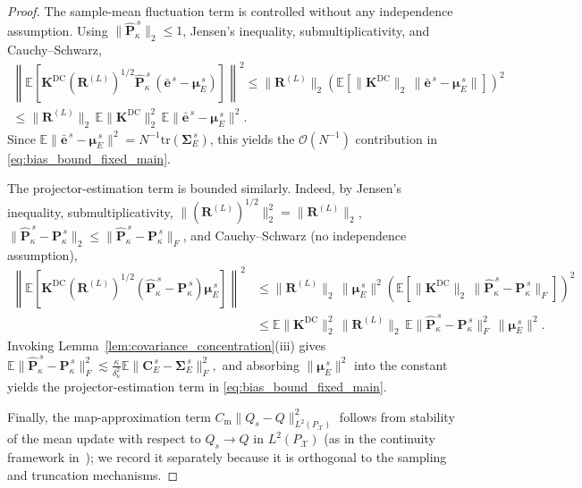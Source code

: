 \documentclass[11pt,a4paper]{article}
\begin{document}
\begin{proof}
The sample-mean fluctuation term is controlled without any independence assumption. Using $\|\hat{\mathbf{P}}_\kappa^{\,s}\|_2\le 1$, Jensen's inequality, submultiplicativity, and Cauchy--Schwarz,
\begin{multline*}
\left\|\mathbb{E}\!\left[\mathbf{K}^{\mathrm{DC}}(\mathbf{R}^{(L)})^{1/2}\hat{\mathbf{P}}_\kappa^{\,s}\,(\bar{\mathbf{e}}^{\,s}-\boldsymbol{\mu}_E^{\,s})\right]\right\|^2
\le
\|\mathbf{R}^{(L)}\|_2
\left(\mathbb{E}\!\left[\|\mathbf{K}^{\mathrm{DC}}\|_2\,\|\bar{\mathbf{e}}^{\,s}-\boldsymbol{\mu}_E^{\,s}\|\right]\right)^2\\
\le
\|\mathbf{R}^{(L)}\|_2\,\mathbb{E}\|\mathbf{K}^{\mathrm{DC}}\|_2^2\,
\mathbb{E}\|\bar{\mathbf{e}}^{\,s}-\boldsymbol{\mu}_E^{\,s}\|^2.
\end{multline*}
Since $\mathbb{E}\|\bar{\mathbf{e}}^{\,s}-\boldsymbol{\mu}_E^{\,s}\|^2=N^{-1}\mathrm{tr}(\boldsymbol{\Sigma}_E^{\,s})$, this yields the $\mathcal{O}(N^{-1})$ contribution in \eqref{eq:bias_bound_fixed_main}.

	The projector-estimation term is bounded similarly. Indeed, by Jensen's inequality, submultiplicativity, $\|(\mathbf{R}^{(L)})^{1/2}\|_2^2=\|\mathbf{R}^{(L)}\|_2$, $\|\hat{\mathbf{P}}_\kappa^{\,s}-\mathbf{P}_\kappa^{\,s}\|_2\le \|\hat{\mathbf{P}}_\kappa^{\,s}-\mathbf{P}_\kappa^{\,s}\|_F$, and Cauchy--Schwarz (no independence assumption),
	\begin{align*}
	\left\|\mathbb{E}\!\left[\mathbf{K}^{\mathrm{DC}}(\mathbf{R}^{(L)})^{1/2}(\hat{\mathbf{P}}_\kappa^{\,s}-\mathbf{P}_\kappa^{\,s})\boldsymbol{\mu}_E^{\,s}\right]\right\|^2
	&\le
	\|\mathbf{R}^{(L)}\|_2\,\|\boldsymbol{\mu}_E^{\,s}\|^2
	\left(\mathbb{E}\!\left[\|\mathbf{K}^{\mathrm{DC}}\|_2\,\|\hat{\mathbf{P}}_\kappa^{\,s}-\mathbf{P}_\kappa^{\,s}\|_F\right]\right)^2\\
	&\le
	\mathbb{E}\|\mathbf{K}^{\mathrm{DC}}\|_2^2\,\|\mathbf{R}^{(L)}\|_2\,
	\mathbb{E}\|\hat{\mathbf{P}}_\kappa^{\,s}-\mathbf{P}_\kappa^{\,s}\|_F^2\,\|\boldsymbol{\mu}_E^{\,s}\|^2.
	\end{align*}
	Invoking Lemma~\ref{lem:covariance_concentration}(iii) gives
	\(
	\mathbb{E}\|\hat{\mathbf{P}}_\kappa^{\,s}-\mathbf{P}_\kappa^{\,s}\|_F^2
\lesssim
\frac{\kappa}{\delta_\kappa^2}\mathbb{E}\|\mathbf{C}_E^{\,s}-\boldsymbol{\Sigma}_E^{\,s}\|_F^2,
\)
and absorbing $\|\boldsymbol{\mu}_E^{\,s}\|^2$ into the constant yields the projector-estimation term in \eqref{eq:bias_bound_fixed_main}.

Finally, the map-approximation term $C_{\mathrm{m}}\|Q_s-Q\|_{L^2(P_{\mathcal{X}})}^2$ follows from stability of the mean update with respect to $Q_s\to Q$ in $L^2(P_{\mathcal{X}})$ (as in the continuity framework in~\cite{ButlerWildeyZhang2020}); we record it separately because it is orthogonal to the sampling and truncation mechanisms.


\end{proof}
\end{document}
